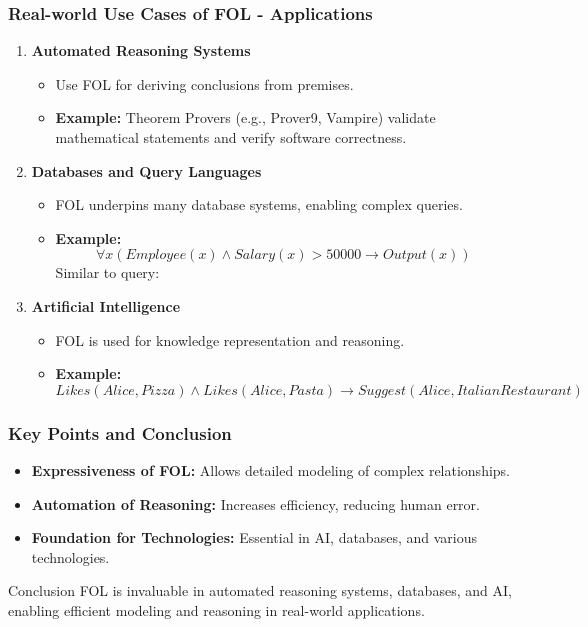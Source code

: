 \documentclass[aspectratio=169]{beamer}
\begin{document}
\begin{frame}[fragile]
    \frametitle{Real-world Use Cases of FOL - Applications}
    \begin{enumerate}
        \item \textbf{Automated Reasoning Systems}
        \begin{itemize}
            \item Use FOL for deriving conclusions from premises.
            \item \textbf{Example:} Theorem Provers (e.g., Prover9, Vampire) validate mathematical statements and verify software correctness.
        \end{itemize}
        
        \item \textbf{Databases and Query Languages}
        \begin{itemize}
            \item FOL underpins many database systems, enabling complex queries.
            \item \textbf{Example:}
            \begin{equation}
                \forall x \left( Employee(x) \land Salary(x) > 50000 \rightarrow Output(x) \right)
            \end{equation}
            Similar to query: 
        \end{itemize}
        
        \item \textbf{Artificial Intelligence}
        \begin{itemize}
            \item FOL is used for knowledge representation and reasoning.
            \item \textbf{Example:}
            \begin{equation}
                Likes(Alice, Pizza) \land Likes(Alice, Pasta) \rightarrow Suggest(Alice, Italian Restaurant)
            \end{equation}
        \end{itemize}
    \end{enumerate}
\end{frame}

\begin{frame}[fragile]
    \frametitle{Key Points and Conclusion}
    \begin{itemize}
        \item \textbf{Expressiveness of FOL:} Allows detailed modeling of complex relationships.
        \item \textbf{Automation of Reasoning:} Increases efficiency, reducing human error.
        \item \textbf{Foundation for Technologies:} Essential in AI, databases, and various technologies.
    \end{itemize}
    \begin{block}{Conclusion}
        FOL is invaluable in automated reasoning systems, databases, and AI, enabling efficient modeling and reasoning in real-world applications.
    \end{block}
\end{frame}
\end{document}
